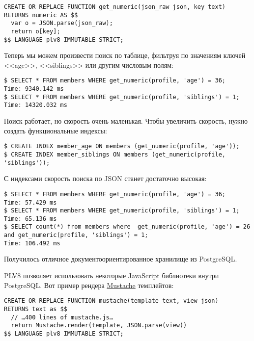 \begin{lstlisting}[label=lst:plv8js11,caption=Функция для JSON]
CREATE OR REPLACE FUNCTION get_numeric(json_raw json, key text)
RETURNS numeric AS $$
  var o = JSON.parse(json_raw);
  return o[key];
$$ LANGUAGE plv8 IMMUTABLE STRICT;
\end{lstlisting}

Теперь мы можем произвести поиск по таблице, фильтруя по значениям ключей <<age>>, <<siblings>> или другим числовым полям:

\begin{lstlisting}[label=lst:plv8js12,caption=Поиск по данным JSON]
$ SELECT * FROM members WHERE get_numeric(profile, 'age') = 36;
Time: 9340.142 ms
$ SELECT * FROM members WHERE get_numeric(profile, 'siblings') = 1;
Time: 14320.032 ms
\end{lstlisting}

Поиск работает, но скорость очень маленькая. Чтобы увеличить скорость, нужно создать функциональные индексы:

\begin{lstlisting}[label=lst:plv8js13,caption=Создание индексов]
$ CREATE INDEX member_age ON members (get_numeric(profile, 'age'));
$ CREATE INDEX member_siblings ON members (get_numeric(profile, 'siblings'));
\end{lstlisting}

С индексами скорость поиска по JSON станет достаточно высокая:

\begin{lstlisting}[label=lst:plv8js14,caption=Поиск по данным JSON с индексами]
$ SELECT * FROM members WHERE get_numeric(profile, 'age') = 36;
Time: 57.429 ms
$ SELECT * FROM members WHERE get_numeric(profile, 'siblings') = 1;
Time: 65.136 ms
$ SELECT count(*) from members where  get_numeric(profile, 'age') = 26 and get_numeric(profile, 'siblings') = 1;
Time: 106.492 ms
\end{lstlisting}

Получилось отличное документоориентированное хранилище из PostgreSQL.

PLV8 позволяет использовать некоторые JavaScript библиотеки внутри PostgreSQL. Вот пример рендера \href{http://mustache.github.com/}{Mustache} темплейтов:

\begin{lstlisting}[label=lst:plv8js15,caption=Функция для рендера Mustache темплейтов]
CREATE OR REPLACE FUNCTION mustache(template text, view json)
RETURNS text as $$
  // …400 lines of mustache.js…
  return Mustache.render(template, JSON.parse(view))
$$ LANGUAGE plv8 IMMUTABLE STRICT;
\end{lstlisting}

